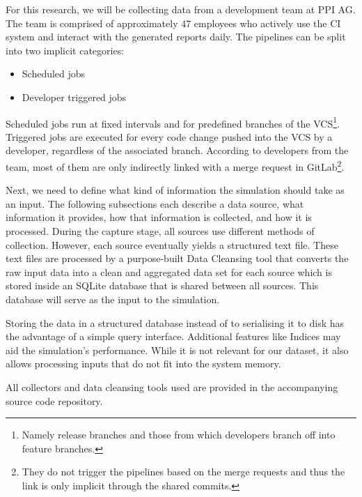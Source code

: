 For this research, we will be collecting data from a development team at PPI AG. The team is comprised of approximately 47 employees who actively use the CI system and interact with the generated reports daily. The pipelines can be split into two implicit categories:
\begin{itemize}
    \item Scheduled jobs
    \item Developer triggered jobs
\end{itemize}
Scheduled jobs run at fixed intervals and for predefined branches of the VCS\footnote{Namely release branches and those from which developers branch off into feature branches.}. Triggered jobs are executed for every code change pushed into the VCS by a developer, regardless of the associated branch. According to developers from the team, most of them are only indirectly linked with a merge request in GitLab\footnote{They do not trigger the pipelines based on the merge requests and thus the link is only implicit through the shared commits.}.

Next, we need to define what kind of information the simulation should take as an input. The following subsections each describe a data source, what information it provides, how that information is collected, and how it is processed. During the capture stage, all sources use different methods of collection. However, each source eventually yields a structured text file. These text files are processed by a purpose-built Data Cleansing tool that converts the raw input data into a clean and aggregated data set for each source which is stored inside an SQLite database that is shared between all sources. This database will serve as the input to the simulation.

Storing the data in a structured database instead of to serialising it to disk has the advantage of a simple query interface. Additional features like Indices may aid the simulation's performance. While it is not relevant for our dataset, it also allows processing inputs that do not fit into the system memory.

All collectors and data cleansing tools used are provided in the accompanying source code repository. %

